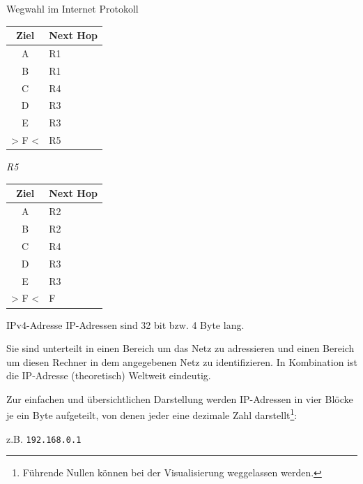 \begin{example}{Wegwahl im Internet Protokoll}
\begin{minipage}{0.25\textwidth}
\begin{center}
            \begin{tabular}{|c|l|}
                \hline
                \textbf{Ziel} & \textbf{Next Hop} \\\hline
                A             & R1                \\
                B             & R1                \\
                C             & R4                \\
                D             & R3                \\
                E             & R3                \\
                > F <         & R5                \\\hline
            \end{tabular}
        \end{center}
    \end{minipage}
    \begin{minipage}{0.25\textwidth}
        \begin{center}
            \emph{R5}

            \begin{tabular}{|c|l|}
                \hline
                \textbf{Ziel} & \textbf{Next Hop} \\\hline
                A             & R2                \\
                B             & R2                \\
                C             & R4                \\
                D             & R3                \\
                E             & R3                \\
                > F <         & F                 \\\hline
            \end{tabular}
        \end{center}
    \end{minipage}
\end{example}

\begin{defi}{IPv4-Adresse}
    IP-Adressen sind 32 bit bzw. 4 Byte lang.

    Sie sind unterteilt in einen Bereich um das Netz zu adressieren und einen Bereich um diesen Rechner in dem angegebenen Netz zu identifizieren.
    In Kombination ist die IP-Adresse (theoretisch) Weltweit eindeutig.

    Zur einfachen und übersichtlichen Darstellung werden IP-Adressen in vier Blöcke je ein Byte aufgeteilt, von denen jeder eine dezimale Zahl darstellt\footnote{Führende Nullen können bei der Visualisierung weggelassen werden.}:

    z.B. \texttt{192.168.0.1}
\end{defi}

